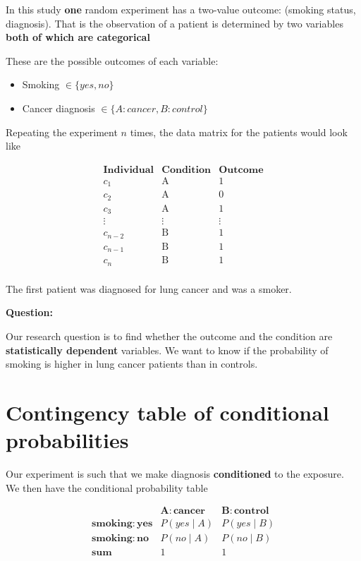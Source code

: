 \documentclass[
]{book}
\providecommand{\tightlist}{%
  \setlength{\itemsep}{0pt}\setlength{\parskip}{0pt}}
\begin{document}
In this study \textbf{one} random experiment has a two-value outcome: (smoking status, diagnosis). That is the observation of a patient is determined by two variables \textbf{both of which are categorical}

These are the possible outcomes of each variable:

\begin{itemize}
\tightlist
\item
  Smoking \(\in\{yes, no\}\)
\item
  Cancer diagnosis \(\in \{A:cancer,B:control\}\)
\end{itemize}

Repeating the experiment \(n\) times, the data matrix for the patients would look like

\[
\begin{array}{ccc}
\mathbf{Individual} & \mathbf{Condition} & \mathbf{Outcome} \\ 
c_1 & \text{A} & \text{1} \\ 
c_2 & \text{A} & \text{0} \\
c_3 & \text{A} & \text{1} \\
\vdots & \vdots & \vdots \\ 
c_{n-2} & \text{B} & \text{1} \\ 
c_{n-1} & \text{B} & \text{1} \\ 
c_{n}& \text{B} & \text{1} \\ 
\end{array}
\]

The first patient was diagnosed for lung cancer and was a smoker.

\textbf{Question:}

Our research question is to find whether the outcome and the condition are \textbf{statistically dependent} variables. We want to know if the probability of smoking is higher in lung cancer patients than in controls.

\hypertarget{contingency-table-of-conditional-probabilities}{%
\section{Contingency table of conditional probabilities}\label{contingency-table-of-conditional-probabilities}}

Our experiment is such that we make diagnosis \textbf{conditioned} to the exposure. We then have the conditional probability table

\[
\begin{array}{cc|c}
    & \mathbf{A:cancer} & \mathbf{B:control} \\ 
    \mathbf{smoking: yes} & P(yes \mid A) & P(yes \mid B) \\ 
    \mathbf{smoking: no} & P(no \mid A) & P(no \mid B) \\ 
    \mathbf{sum} & 1 & 1
\end{array}
\]
\end{document}
